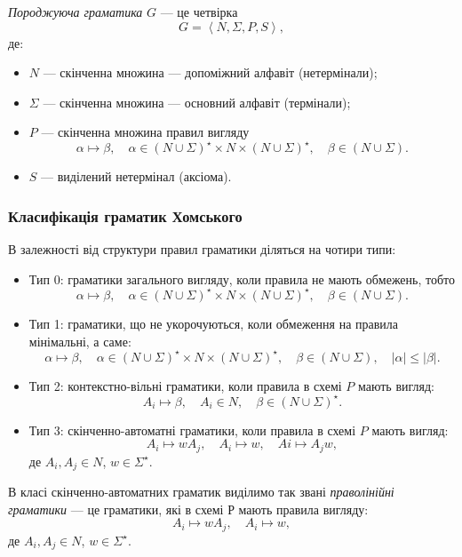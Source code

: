 \textit{Породжуюча граматика} $G$ --- це четвірка
\[ G = \left\langle N, \Sigma, P, S \right\rangle,\]
де: 
\begin{itemize}
	\item $N$ --- скінченна множина --- допоміжний алфавіт (нетермінали);
	\item $\Sigma$ --- скінченна множина --- основний алфавіт (термінали);
	\item $P$ --- скінченна множина правил вигляду
	\[
	\alpha \mapsto \beta, \quad \alpha \in \left(N \cup \Sigma\right)^\star \times N \times	\left(N \cup \Sigma\right)^\star, \quad \beta \in \left(N \cup \Sigma\right).
	\]
	\item $S$ --- виділений нетермінал (аксіома).
\end{itemize}

\subsubsection{Класифікація граматик Хомського}

В залежності від структури правил граматики діляться на чотири типи:
\begin{itemize}
	\item Тип 0: граматики загального вигляду, коли правила не мають обмежень, тобто
	\[
	\alpha \mapsto \beta, \quad \alpha \in \left(N \cup \Sigma\right)^\star \times N \times	\left(N \cup \Sigma\right)^\star, \quad \beta \in \left(N \cup \Sigma\right).
	\]
	\item Тип 1: граматики, що не укорочуються, коли обмеження на правила мінімальні, а саме:
	\[
	\alpha \mapsto \beta, \quad \alpha \in \left(N \cup \Sigma\right)^\star \times N \times	\left(N \cup \Sigma\right)^\star, \quad \beta \in \left(N \cup \Sigma\right), \quad |\alpha| \le |\beta|.
	\]
	\item Тип 2: контекстно-вільні граматики, коли правила в схемі $P$ мають вигляд:
	\[
	A_i \mapsto \beta, \quad A_i \in N, \quad \beta \in \left(N \cup \Sigma\right)^\star.
	\]
	\item Тип 3: скінченно-автоматні граматики, коли правила в схемі $P$ мають вигляд:
	\[
	A_i \mapsto w A_j, \quad A_i \mapsto w, \quad Ai \mapsto A_j w,
	\]
	де $A_i, A_j \in N$, $w \in \Sigma^\star$.
\end{itemize}

В класі скінченно-автоматних граматик виділимо так звані \textit{праволінійні граматики} --- це граматики, які в схемі Р мають правила вигляду:
\[ A_i \mapsto w A_j, \quad A_i \mapsto w,\]
де $A_i, A_j \in N$, $w \in \Sigma^\star$. \medskip

